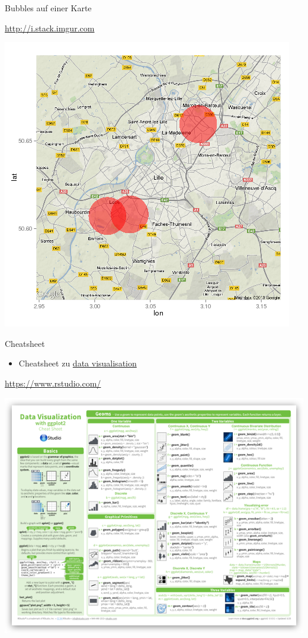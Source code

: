 \documentclass[ignorenonframetext,]{beamer}
\providecommand{\tightlist}{%
\setlength{\itemsep}{0pt}\setlength{\parskip}{0pt}}
\begin{document}
\begin{frame}{Bubbles auf einer Karte}

\url{http://i.stack.imgur.com}

\includegraphics{./tex2pdf.956/5a5e1e1264b3f174f2e8d2c9935aced7b6988469.png}

\end{frame}

\begin{frame}{Cheatsheet}

\begin{itemize}
\tightlist
\item
  Cheatsheet zu
  \href{https://www.rstudio.com/wp-content/uploads/2015/04/ggplot2-cheatsheet.pdf}{data
  visualisation}
\end{itemize}

\url{https://www.rstudio.com/}

\includegraphics{./tex2pdf.956/4d72d67e64b35d369cc1d2ffe340e20dfd9cd089.png}

\end{frame}
\end{document}
